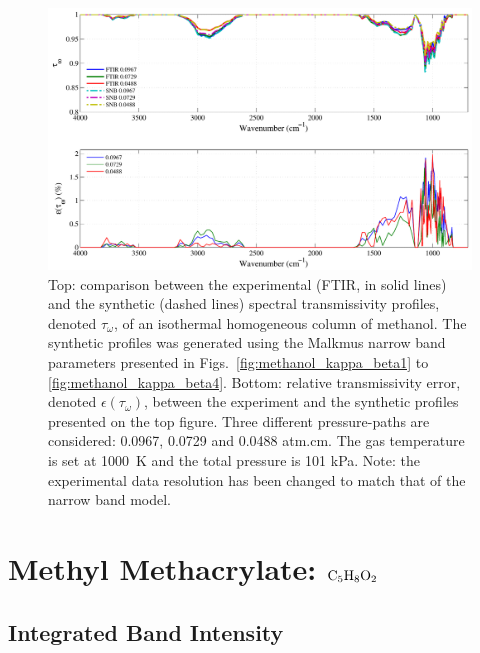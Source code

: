 \begin{figure}[p]
\includegraphics[width=\textwidth]{Figures/Comparison_Fit_Methanol_MALKMUS_Temp1000K.pdf}
\caption{Top: comparison between the experimental (FTIR, in solid lines) and the synthetic (dashed lines) spectral transmissivity profiles, denoted $\tau_{\omega}$, of an isothermal homogeneous column of methanol. The synthetic profiles was generated using the Malkmus narrow band parameters presented in Figs.~\ref{fig:methanol_kappa_beta1} to \ref{fig:methanol_kappa_beta4}. Bottom: relative transmissivity error, denoted $\epsilon{(\tau_{\omega})}$, between the experiment and the synthetic profiles presented on the top figure. Three different pressure-paths are considered: 0.0967, 0.0729 and 0.0488 atm.cm. The gas temperature is set at 1000~K and the total pressure is 101 kPa. Note: the experimental data resolution has been changed to match that of the narrow band model. \label{fig:methanol_SNBVerify_1000K}}
\end{figure}


\clearpage

\section{Methyl Methacrylate: $\rm C_5H_8O_2$}

\subsection{Integrated Band Intensity}


